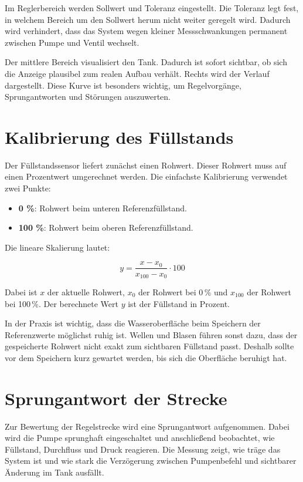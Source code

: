 \documentclass[12pt,a4paper]{scrartcl}
\newcommand{\SI}[2]{#1\,#2}
\newcommand{\percent}{\%}
\begin{document}
Im Reglerbereich werden Sollwert und Toleranz eingestellt. Die Toleranz legt fest, in welchem Bereich um den Sollwert herum nicht weiter geregelt wird. Dadurch wird verhindert, dass das System wegen kleiner Messschwankungen permanent zwischen Pumpe und Ventil wechselt.

Der mittlere Bereich visualisiert den Tank. Dadurch ist sofort sichtbar, ob sich die Anzeige plausibel zum realen Aufbau verhält. Rechts wird der Verlauf dargestellt. Diese Kurve ist besonders wichtig, um Regelvorgänge, Sprungantworten und Störungen auszuwerten.

\section{Kalibrierung des Füllstands}

Der Füllstandssensor liefert zunächst einen Rohwert. Dieser Rohwert muss auf einen Prozentwert umgerechnet werden. Die einfachste Kalibrierung verwendet zwei Punkte:

\begin{itemize}
  \item \textbf{0 \%}: Rohwert beim unteren Referenzfüllstand.
  \item \textbf{100 \%}: Rohwert beim oberen Referenzfüllstand.
\end{itemize}

Die lineare Skalierung lautet:

\[
  y = \frac{x - x_0}{x_{100} - x_0} \cdot 100
\]

Dabei ist \(x\) der aktuelle Rohwert, \(x_0\) der Rohwert bei \SI{0}{\percent} und \(x_{100}\) der Rohwert bei \SI{100}{\percent}. Der berechnete Wert \(y\) ist der Füllstand in Prozent.

In der Praxis ist wichtig, dass die Wasseroberfläche beim Speichern der Referenzwerte möglichst ruhig ist. Wellen und Blasen führen sonst dazu, dass der gespeicherte Rohwert nicht exakt zum sichtbaren Füllstand passt. Deshalb sollte vor dem Speichern kurz gewartet werden, bis sich die Oberfläche beruhigt hat.

\section{Sprungantwort der Strecke}

Zur Bewertung der Regelstrecke wird eine Sprungantwort aufgenommen. Dabei wird die Pumpe sprunghaft eingeschaltet und anschließend beobachtet, wie Füllstand, Durchfluss und Druck reagieren. Die Messung zeigt, wie träge das System ist und wie stark die Verzögerung zwischen Pumpenbefehl und sichtbarer Änderung im Tank ausfällt.
\end{document}
